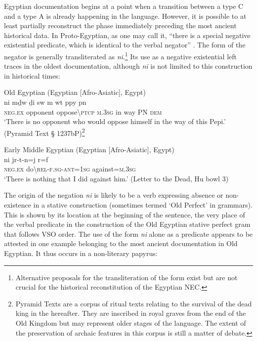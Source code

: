 \documentclass[output=paper,draft,draftmode,colorlinks,citecolor=brown]{langscibook}
\begin{document}
Egyptian documentation begins at a point when a transition between a type C and a type A is already happening in the language. However, it is possible to at least partially reconstruct the phase immediately preceding the most ancient historical data. In Proto-Egyptian, as one may call it, ``there is a special negative existential predicate, which is identical to the verbal negator'' \citep[6]{Croft1991}.
The form of the negator is generally transliterated as \textit{ni}.\footnote{Alternative proposals for the transliteration of the form exist but are not crucial for the historical reconstitution of the Egyptian NEC.} 
Its use as a negative existential left traces in the oldest documentation, although \textit{ni} is not limited to this construction in historical times:

\ea Old Egyptian (Egyptian [Afro-Asiatic], Egypt) \label{ex:AE1}\\
  	\gll ni mḏ{\ꜣ}w ḏ{\ꜣ}i sw m w{\ꜣ}t ppy pn\\
	\textsc{neg.ex}	opponent oppose\textbackslash\textsc{ptcp} \textsc{m.3sg} in way 	PN \textsc{dem}\\
	\glt ‘There is no opponent who would oppose himself in the way of this Pepi.’ (Pyramid Text § 1237bP)\footnote{Pyramid Texts are a corpus of ritual texts relating to the survival of the dead king in the hereafter. They are inscribed in royal graves from the end of the Old Kingdom but may represent older stages of the language. The extent of the preservation of archaic features in this corpus is still a matter of debate.}
\z

\ea Early Middle Egyptian (Egyptian [Afro-Asiatic], Egypt) \label{ex:AE2}\\
	\gll ni jr-t-n=j r=f\\
	\textsc{neg.ex} do\textbackslash\textsc{rel-f.sg-ant=1sg} against=\textsc{m.3sg}\\
	\glt ‘There is nothing that I did against him.’ (Letter to the Dead, Hu bowl 3)
\z

The origin of the negation \textit{ni} is likely to be a verb expressing absence or non-existence in a stative construction (sometimes termed ‘Old Perfect’ in grammars). This is shown by its location at the beginning of the sentence, the very place of the verbal predicate in the construction of the Old Egyptian stative perfect gram that follows VSO order. The use of the form \textit{ni} alone as a predicate appears to be attested in one example belonging to the most ancient documentation in Old Egyptian. It thus occurs in a non-literary papyrus: 
\end{document}
